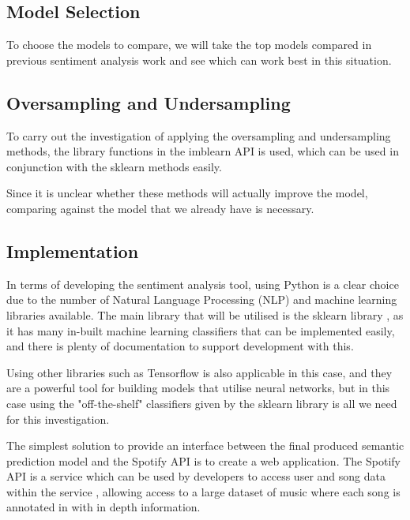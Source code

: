 \subsection{Model Selection}

To choose the models to compare, we will take the top models compared in previous sentiment analysis work \cite{towardsDS} and see which can work best in this situation. 

\subsection{Oversampling and Undersampling}

To carry out the investigation of applying the oversampling and undersampling methods, the library functions in the imblearn API is used, which can be used in conjunction with the sklearn methods easily.

Since it is unclear whether these methods will actually improve the model, comparing against the model that we already have is necessary.


\subsection{Implementation}

In terms of developing the sentiment analysis tool, using Python is a clear choice due to the number of Natural Language Processing (NLP) and machine learning libraries available. The main library that will be utilised is the sklearn library \cite{sklearn}, as it has many in-built machine learning classifiers that can be implemented easily, and there is plenty of documentation to support development with this. 

Using other libraries such as Tensorflow is also applicable in this case,  and they are a powerful tool for building models that utilise neural networks, but in this case using the "off-the-shelf" classifiers given by the sklearn library is all we need for this investigation.

The simplest solution to provide an interface between the final produced semantic prediction model and the Spotify API is to create a web application. The Spotify API is a service which can be used by developers to access user and song data within the service \cite{nodeSpotify}, allowing access to a large dataset of music where each song is annotated in with in depth information.

